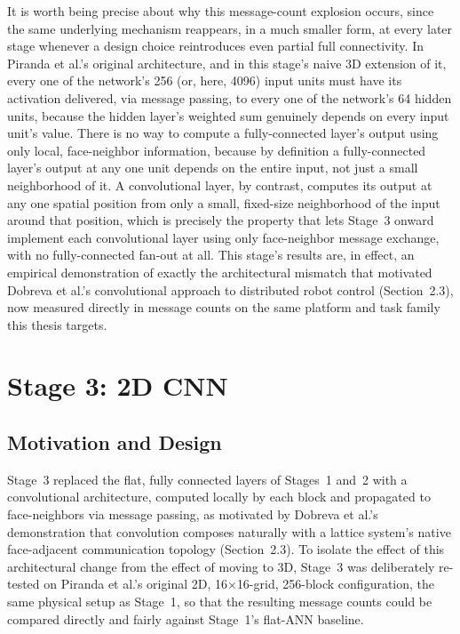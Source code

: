 \documentclass[12pt,a4paper]{report}
\begin{document}
It is worth being precise about why this message-count explosion occurs, since the same underlying mechanism reappears, in a much smaller form, at every later stage whenever a design choice reintroduces even partial full connectivity. In Piranda et al.'s original architecture, and in this stage's naive 3D extension of it, every one of the network's 256 (or, here, 4096) input units must have its activation delivered, via message passing, to every one of the network's 64 hidden units, because the hidden layer's weighted sum genuinely depends on every input unit's value. There is no way to compute a fully-connected layer's output using only local, face-neighbor information, because by definition a fully-connected layer's output at any one unit depends on the entire input, not just a small neighborhood of it. A convolutional layer, by contrast, computes its output at any one spatial position from only a small, fixed-size neighborhood of the input around that position, which is precisely the property that lets Stage~3 onward implement each convolutional layer using only face-neighbor message exchange, with no fully-connected fan-out at all. This stage's results are, in effect, an empirical demonstration of exactly the architectural mismatch that motivated Dobreva et al.'s convolutional approach to distributed robot control (Section~2.3), now measured directly in message counts on the same platform and task family this thesis targets.

\section{Stage 3: 2D CNN}
\label{sec:stage3}

\subsection*{Motivation and Design}

Stage~3 replaced the flat, fully connected layers of Stages~1 and~2 with a convolutional architecture, computed locally by each block and propagated to face-neighbors via message passing, as motivated by Dobreva et al.'s demonstration that convolution composes naturally with a lattice system's native face-adjacent communication topology (Section~2.3). To isolate the effect of this architectural change from the effect of moving to 3D, Stage~3 was deliberately re-tested on Piranda et al.'s original 2D, 16$\times$16-grid, 256-block configuration, the same physical setup as Stage~1, so that the resulting message counts could be compared directly and fairly against Stage~1's flat-ANN baseline.
\end{document}
